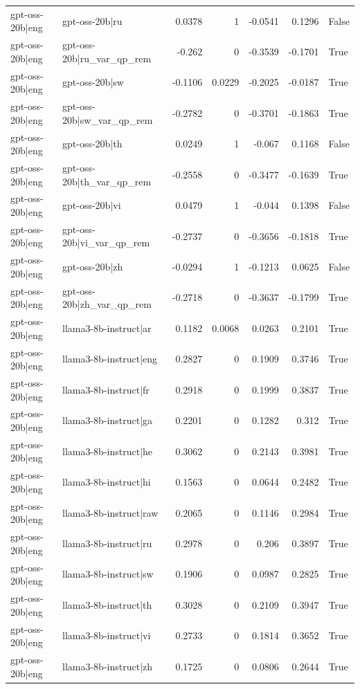 \begin{table}
\begin{tabular}{l l r r r r l}
gpt-oss-20b|eng & gpt-oss-20b|ru & 0.0378 & 1 & -0.0541 & 0.1296 & False \\
gpt-oss-20b|eng & gpt-oss-20b|ru_var_qp_rem & -0.262 & 0 & -0.3539 & -0.1701 & True \\
gpt-oss-20b|eng & gpt-oss-20b|sw & -0.1106 & 0.0229 & -0.2025 & -0.0187 & True \\
gpt-oss-20b|eng & gpt-oss-20b|sw_var_qp_rem & -0.2782 & 0 & -0.3701 & -0.1863 & True \\
gpt-oss-20b|eng & gpt-oss-20b|th & 0.0249 & 1 & -0.067 & 0.1168 & False \\
gpt-oss-20b|eng & gpt-oss-20b|th_var_qp_rem & -0.2558 & 0 & -0.3477 & -0.1639 & True \\
gpt-oss-20b|eng & gpt-oss-20b|vi & 0.0479 & 1 & -0.044 & 0.1398 & False \\
gpt-oss-20b|eng & gpt-oss-20b|vi_var_qp_rem & -0.2737 & 0 & -0.3656 & -0.1818 & True \\
gpt-oss-20b|eng & gpt-oss-20b|zh & -0.0294 & 1 & -0.1213 & 0.0625 & False \\
gpt-oss-20b|eng & gpt-oss-20b|zh_var_qp_rem & -0.2718 & 0 & -0.3637 & -0.1799 & True \\
gpt-oss-20b|eng & llama3-8b-instruct|ar & 0.1182 & 0.0068 & 0.0263 & 0.2101 & True \\
gpt-oss-20b|eng & llama3-8b-instruct|eng & 0.2827 & 0 & 0.1909 & 0.3746 & True \\
gpt-oss-20b|eng & llama3-8b-instruct|fr & 0.2918 & 0 & 0.1999 & 0.3837 & True \\
gpt-oss-20b|eng & llama3-8b-instruct|ga & 0.2201 & 0 & 0.1282 & 0.312 & True \\
gpt-oss-20b|eng & llama3-8b-instruct|he & 0.3062 & 0 & 0.2143 & 0.3981 & True \\
gpt-oss-20b|eng & llama3-8b-instruct|hi & 0.1563 & 0 & 0.0644 & 0.2482 & True \\
gpt-oss-20b|eng & llama3-8b-instruct|raw & 0.2065 & 0 & 0.1146 & 0.2984 & True \\
gpt-oss-20b|eng & llama3-8b-instruct|ru & 0.2978 & 0 & 0.206 & 0.3897 & True \\
gpt-oss-20b|eng & llama3-8b-instruct|sw & 0.1906 & 0 & 0.0987 & 0.2825 & True \\
gpt-oss-20b|eng & llama3-8b-instruct|th & 0.3028 & 0 & 0.2109 & 0.3947 & True \\
gpt-oss-20b|eng & llama3-8b-instruct|vi & 0.2733 & 0 & 0.1814 & 0.3652 & True \\
gpt-oss-20b|eng & llama3-8b-instruct|zh & 0.1725 & 0 & 0.0806 & 0.2644 & True \\

\end{tabular}
\end{table}
